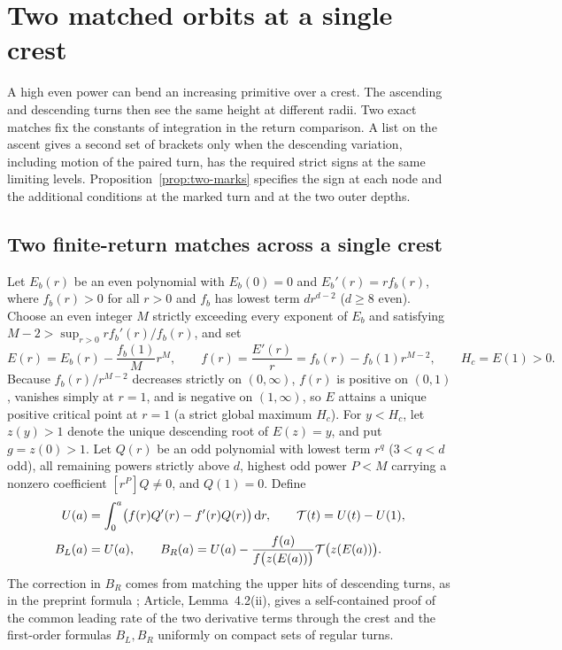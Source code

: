 \section{Two matched orbits at a single crest}\label{sec:two-matches}
A high even power can bend an increasing primitive over a crest. The
ascending and descending turns then see the same height at different
radii. Two exact matches fix the constants of integration in the return
comparison. A list on the ascent gives a second set of brackets only
when the descending variation, including motion of the paired turn,
has the required strict signs at the same limiting levels.
Proposition~\ref{prop:two-marks} specifies the sign at each node and
the additional conditions at the marked turn and at the two outer depths.

\subsection{Two finite-return matches across a single crest}\label{subsec:two-marks}
Let $E_b(r)$ be an even polynomial with $E_b(0)=0$ and $E_b'(r)=r f_b(r)$, where $f_b(r)>0$ for all
$r>0$ and $f_b$ has lowest term $d r^{d-2}$ ($d\ge 8$ even). Choose an even integer $M$ strictly
exceeding every exponent of $E_b$ and satisfying $M-2>\sup_{r>0} r f_b'(r)/f_b(r)$, and set
\begin{equation}\label{eq:crest-wall}
  E(r) = E_b(r) - \frac{f_b(1)}{M}r^M, \qquad f(r) = \frac{E'(r)}{r} = f_b(r) - f_b(1)r^{M-2}, \qquad H_c = E(1) > 0.
\end{equation}
Because $f_b(r)/r^{M-2}$ decreases strictly on $(0,\infty)$, $f(r)$ is positive on $(0,1)$, vanishes
simply at $r=1$, and is negative on $(1,\infty)$, so $E$ attains a unique positive critical point at
$r=1$ (a strict global maximum $H_c$). For $y<H_c$, let $z(y)>1$ denote the unique descending root of
$E(z)=y$, and put $g=z(0)>1$. Let $Q(r)$ be an odd polynomial with lowest term $r^q$ ($3<q<d$ odd),
all remaining powers strictly above $d$, highest odd power $P<M$ carrying a nonzero coefficient
$[r^P]Q\ne 0$, and $Q(1)=0$. Define
\begin{align}
  U(a) &= \int_0^a \bigl(f(r)Q'(r)-f'(r)Q(r)\bigr)\,\mathrm{d} r, \qquad \mathcal{T}(t) = U(t) - U(1), \nonumber\\
  B_L(a) &= U(a), \qquad B_R(a) = U(a) - \frac{f(a)}{f\bigl(z(E(a))\bigr)}\mathcal{T}\bigl(z(E(a))\bigr). \label{eq:two-actions}
\end{align}
The correction in $B_R$ comes from matching the upper hits of
descending turns, as in the preprint formula
\cite[supplement, p.~16, (S5.12)--(S5.13)]{LuDegree}; Article,
Lemma~4.2\textup{(ii)}, gives a self-contained proof of the common
leading rate of the two derivative terms through the crest and the
first-order formulas $B_L,B_R$ uniformly on compact sets of regular
turns.

